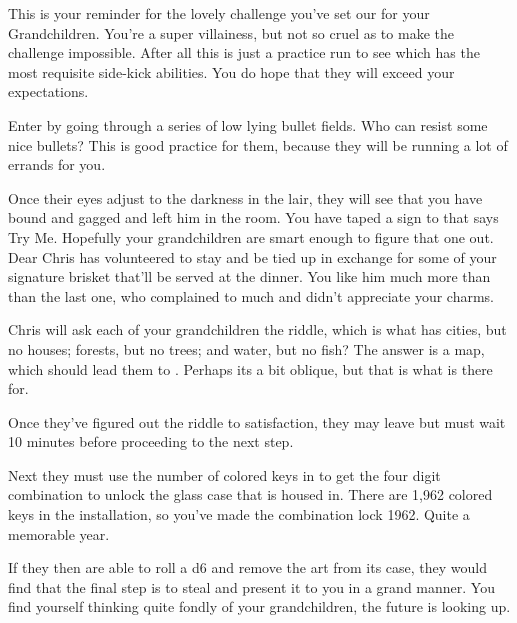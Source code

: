 \documentclass[green]{LRSguildcamp1}
\begin{document}
\name{\gGrandmasChallenge{}}

This is your reminder for the lovely challenge you've set our for your Grandchildren. You're a super villainess, but not so cruel as to make the challenge impossible. After all this is just a practice run to see which has the most requisite side-kick abilities. You do hope that they will exceed your expectations. 

Enter \pGrandmasLair{} by going through a series of low lying bullet fields. Who can resist some nice bullets? This is good practice for them, because they will be running a lot of errands for you. 


Once their eyes adjust to the darkness in the lair, they will see that you have bound and gagged \cChrisHemsworth{} and left him in the room. You have taped a sign to \cChrisHemsworth{} that says Try Me. Hopefully your grandchildren are smart enough to figure that one out. Dear Chris has volunteered to stay and be tied up in exchange for some of your signature brisket that'll be served at the dinner. You like him much more than than the last one, who complained to much and didn't appreciate your charms. 


Chris will ask each of your grandchildren the riddle, which is what has cities, but no houses; forests, but no trees; and water, but no fish? The answer is a map, which should lead them to \iArtworkThree{}. Perhaps its a bit oblique, but that is what \cChrisHemsworth{} is there for. 

Once they've figured out the riddle to \cChrisHemsworth{} satisfaction, they may leave but must wait 10 minutes before proceeding to the next step. 

Next they must use the number of colored keys in \iArtworkThree{} to get the four digit combination to unlock the glass case that \iArtworkThree{} is housed in. There are 1,962 colored keys in the installation, so you've made the combination lock 1962. Quite a memorable year.  


If they then are able to roll a d6 and remove the art from its case, they would find that the final step is to steal \cOS{} \iBagofHolding{} and present it to you in a grand manner. You find yourself thinking quite fondly of your grandchildren, the future is looking up. 
\end{document}
